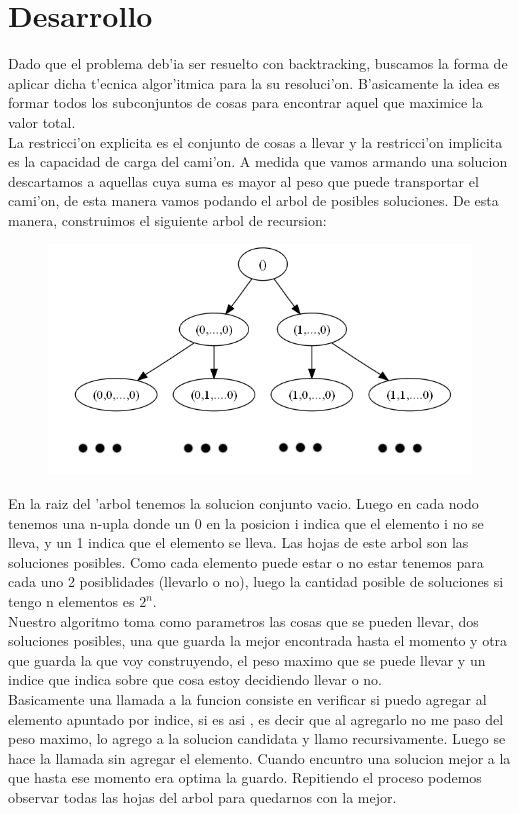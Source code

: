 \section{Desarrollo}
Dado que el problema deb'ia ser resuelto con backtracking, buscamos la forma de aplicar dicha t'ecnica algor'itmica para la su resoluci'on. B'asicamente la idea es formar todos los subconjuntos de cosas para encontrar aquel que maximice la valor total.\\ 
La restricci'on explicita es el conjunto de cosas a llevar y la restricci'on implicita es la capacidad de carga del cami'on. A 
medida que vamos armando una solucion descartamos a aquellas cuya suma es mayor al peso que puede transportar el cami'on, de 
esta manera vamos podando el arbol de posibles soluciones.
De esta manera, construimos el siguiente arbol de recursion:
\begin{figure}[H]
\centering
\includegraphics[scale=0.5]{./ejercicio2/arbol.png}
\end{figure}
En la raiz del 'arbol tenemos la solucion conjunto vacio. Luego en cada nodo tenemos una n-upla donde un 0 en la posicion i 
indica que el elemento i no se lleva, y un 1 indica que el elemento se lleva. Las hojas de este arbol son las soluciones 
posibles. Como cada elemento puede estar o no estar tenemos para cada uno 2 posiblidades (llevarlo o no), luego la cantidad 
posible de soluciones si tengo n elementos es $2^n$.\\
Nuestro algoritmo toma como parametros las cosas que se pueden llevar, dos soluciones posibles, una que guarda la mejor 
encontrada hasta el momento y otra que guarda la que voy construyendo, el peso maximo que se puede llevar y un indice que 
indica sobre que cosa estoy decidiendo llevar o no.\\
Basicamente una llamada a la funcion consiste en verificar si puedo agregar al elemento apuntado por indice, si es asi , es 
decir que al agregarlo no me paso del peso maximo, lo agrego a la solucion candidata y llamo recursivamente. Luego se hace la 
llamada sin agregar el elemento. Cuando encuntro una solucion mejor a la que hasta ese momento era optima la guardo. Repitiendo 
el proceso podemos observar todas las hojas del arbol para quedarnos con la mejor.\\  

